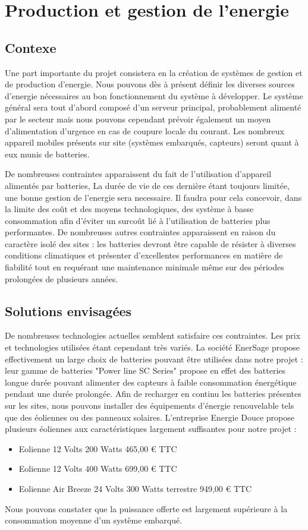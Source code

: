 \section {Production et gestion de l'energie}
	\subsection {Contexe}
Une part importante du projet consistera en la création de systèmes de gestion et de production d'energie.
Nous pouvons dès à présent définir les diverses sources d'energie nécessaires au bon fonctionnement du système à développer.
Le système général sera tout d'abord composé d'un serveur principal, probablement alimenté par le secteur mais nous pouvons cependant prévoir également un moyen d'alimentation d'urgence en cas de coupure locale du courant.
Les nombreux appareil mobiles présents sur site (systèmes embarqués, capteurs) seront quant à eux munis de batteries.

De nombreuses contraintes apparaissent du fait de l'utilisation d'appareil alimentés par batteries, La durée de vie de ces dernière étant toujours limitée, une bonne gestion de l'energie sera necessaire. Il faudra pour cela concevoir, dans la limite des coût et des moyens technologiques, des système à basse consommation afin d'éviter un surcoût lié à l'utilisation de batteries plus performantes. De nombreuses autres contraintes apparaissent en raison du caractère isolé des sites : les batteries devront être capable de résister à diverses conditions climatiques et présenter d'excellentes performances en matière de fiabilité tout en requérant une maintenance minimale même sur des périodes prolongées de plusieurs années.


	\subsection {Solutions envisagées}
De nombreuses technologies actuelles semblent satisfaire ces contraintes. Les prix et technologies utilisées étant cependant très variés.
La société EnerSage propose effectivement un large choix de batteries pouvant être utilisées dans notre projet : leur gamme de batteries "Power line SC Series" propose en effet des batteries longue durée pouvant alimenter des capteurs à faible consommation énergétique pendant une durée prolongée.
Afin de recharger en continu les batteries présentes sur les sites, nous pouvons installer des équipements d'énergie renouvelable tels que des éoliennes ou des panneaux solaires.
L'entreprise Energie Douce propose plusieurs éoliennes aux caractéristiques largement suffisantes pour notre projet :
\begin{itemize}
	\item Eolienne 12 Volts 200 Watts 465,00 € TTC
	\item Eolienne 12 Volts 400 Watts 699,00 € TTC
	\item Eolienne Air Breeze 24 Volts 300 Watts terrestre 949,00 € TTC
\end{itemize}
Nous pouvons constater que la puissance offerte est largement supérieure à la consommation moyenne d'un système embarqué.

